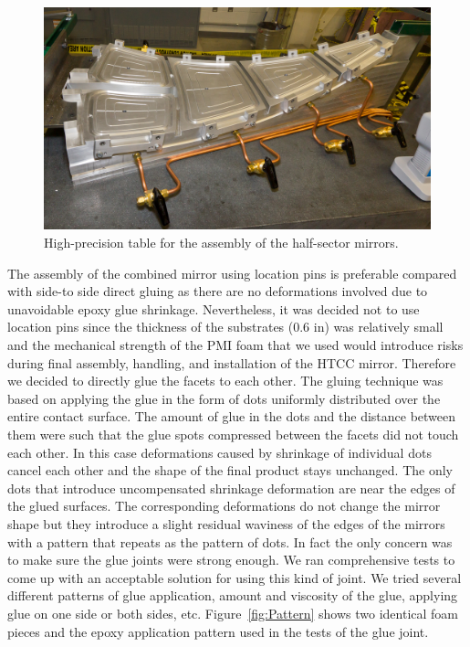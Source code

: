 \begin{figure}[ht]
    \centering
    \includegraphics[width=1.0\linewidth]{images/Half-sector_assem_tb2.JPG}
    \caption{High-precision table for the assembly of the half-sector mirrors.}
    \label{fig:Half-sector_assem_tb2}
\end{figure}

The assembly of the combined mirror using location pins is preferable compared with side-to side direct gluing as
there are no deformations involved due to unavoidable epoxy glue shrinkage. Nevertheless, it was decided not to
use location pins since the thickness of the substrates (0.6 in) was relatively small and the mechanical strength of
the PMI foam that we used would introduce risks during final assembly, handling, and installation of the HTCC mirror.
Therefore we decided to directly glue the facets to each other. The gluing technique was based on applying the glue
in the form of dots uniformly distributed over the entire contact surface. The amount of glue in the dots and the
distance between them were such that the glue spots compressed between the facets did not touch each other. In
this case deformations caused by shrinkage of individual dots cancel each other and the shape of the final product
stays unchanged. The only dots that introduce uncompensated shrinkage deformation are near the edges of the glued
surfaces. The corresponding deformations do not change the mirror shape but they introduce a slight residual
waviness of the edges of the mirrors with a pattern that repeats as the pattern of dots. In fact the only concern was
to make sure the glue joints were strong enough. We ran comprehensive tests to come up with an acceptable solution
for using this kind of joint. We tried several different patterns of glue application, amount and viscosity of the glue,
applying glue on one side or both sides, etc. Figure~\ref{fig:Pattern} shows two identical foam pieces and the epoxy
application pattern used in the tests of the glue joint. 

